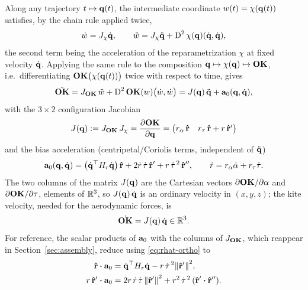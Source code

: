 \documentclass[10pt, a4paper]{article}
\begin{document}
Along any trajectory $t \mapsto \vb q(t)$, the intermediate coordinate
$w(t) = \chi(\vb q(t))$ satisfies, by the chain rule applied twice,
\begin{equation}
    \dot w = J_\chi \dot{\vb q},
    \qquad
    \ddot w = J_\chi \ddot{\vb q}
    + \operatorname{D}^2\chi(\vb q)(\dot{\vb q}, \dot{\vb q}),
\end{equation}
the second term being the acceleration of the reparametrization $\chi$ at
fixed velocity $\dot{\vb q}$.  Applying the same rule to the composition
$\vb q \mapsto \chi(\vb q) \mapsto \vb{OK}$, i.e.\ differentiating
$\vb{OK}\bigl(\chi(\vb q(t))\bigr)$ twice with respect to time, gives
\begin{equation}
    \ddot{\vb{OK}}
    = J_{\vb{OK}} \, \ddot w
    + \operatorname{D}^2\vb{OK}(w)\bigl(\dot w, \dot w\bigr)
    = J(\vb q)\, \ddot{\vb q} + \vb a_0(\vb q, \dot{\vb q}),
\end{equation}
with the $3\times 2$ configuration Jacobian
\begin{equation} \label{eq:D}
    J(\vb q)
    := J_{\vb{OK}}\, J_\chi
    = \frac{\partial \vb{OK}}{\partial \vb q}
    = \begin{pmatrix} r_\alpha\,\vu r & r_\tau\,\vu r + r\,\vu r' \end{pmatrix}
\end{equation}
and the bias acceleration (centripetal/Coriolis terms, independent of $\ddot{\vb q}$)
\begin{equation} \label{eq:a0}
    \vb a_0(\vb q, \dot{\vb q})
    = \bigl( \dot{\vb q}^\top H_r \dot{\vb q} \bigr)\, \vu r
    + 2\dot r\,\dot\tau\,\vu r'
    + r\,\dot\tau^{\,2}\,\vu r'',
    \qquad
    \dot r = r_\alpha\dot\alpha + r_\tau\dot\tau.
\end{equation}
The two columns of the matrix $J(\vb q)$ are the Cartesian vectors
$\partial\vb{OK}/\partial\alpha$ and $\partial\vb{OK}/\partial\tau$, elements of
$\mathbb{R}^3$, so $J(\vb q)\,\dot{\vb q}$ is an ordinary velocity in $(x, y, z)$; the
kite velocity, needed for the aerodynamic forces, is
\begin{equation} \label{eq:velocity}
    \dot{\vb{OK}} = J(\vb q)\,\dot{\vb q} \in \mathbb{R}^3.
\end{equation}
For reference, the scalar products of $\vb a_0$ with the columns of
$J_{\vb{OK}}$, which reappear in Section~\ref{sec:assembly}, reduce using
\eqref{eq:rhat-ortho} to
\begin{equation} \label{eq:a0-projections}
    \begin{aligned}
        \rhat \vdot \vb a_0
        &= \dq^\top H_r \dq - r\,\dot\tau^{\,2}\norm{\rhat'}^2,\\
        r\,\rhat' \vdot \vb a_0
        &= 2r\,\dot r\,\dot\tau\,\norm{\rhat'}^2
        + r^2\,\dot\tau^{\,2}\,(\rhat' \vdot \rhat'').
    \end{aligned}
\end{equation}
\end{document}
